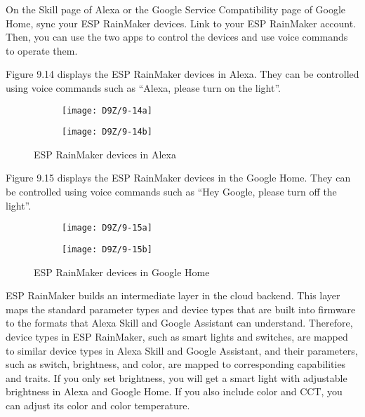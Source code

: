 \documentclass[a4paper,12pt]{book}
\begin{document}
On the Skill page of Alexa or the Google Service Compatibility page of Google Home, sync your ESP RainMaker devices. Link to your ESP RainMaker account. Then, you can use the two apps to control the devices and use voice commands to operate them.

Figure 9.14 displays the ESP RainMaker devices in Alexa. They can be controlled using voice commands such as “Alexa, please turn on the light”.


\begin{figure}[h!]
    \Centering
    \begin{subfigure}{0.4\textwidth}
        \RaggedLeft
        \texttt{[image: D9Z/9-14a]} 
    \end{subfigure}\hspace{1em}
    \begin{subfigure}{0.4\textwidth}
        \RaggedRight
        \texttt{[image: D9Z/9-14b]}
    \end{subfigure}
    \caption{ESP RainMaker devices in Alexa}
\end{figure}

Figure 9.15 displays the ESP RainMaker devices in the Google Home. They can be controlled using voice commands such as “Hey Google, please turn off the light”.

\begin{figure}[h!]
    \Centering
    \begin{subfigure}{0.4\textwidth}
        \RaggedLeft
        \texttt{[image: D9Z/9-15a]} 
    \end{subfigure}\hspace{1em}
    \begin{subfigure}{0.4\textwidth}
        \RaggedRight
        \texttt{[image: D9Z/9-15b]}
    \end{subfigure}
    \caption{ESP RainMaker devices in Google Home}
\end{figure}

ESP RainMaker builds an intermediate layer in the cloud backend. This layer maps the standard parameter types and device types that are built into firmware to the formats that Alexa Skill and Google Assistant can understand. Therefore, device types in ESP RainMaker, such as smart lights and switches, are mapped to similar device types in Alexa Skill and Google Assistant, and their parameters, such as switch, brightness, and color, are mapped to corresponding capabilities and traits. If you only set brightness, you will get a smart light with adjustable brightness in Alexa and Google Home. If you also include color and CCT, you can adjust its color and color temperature.
\end{document}
